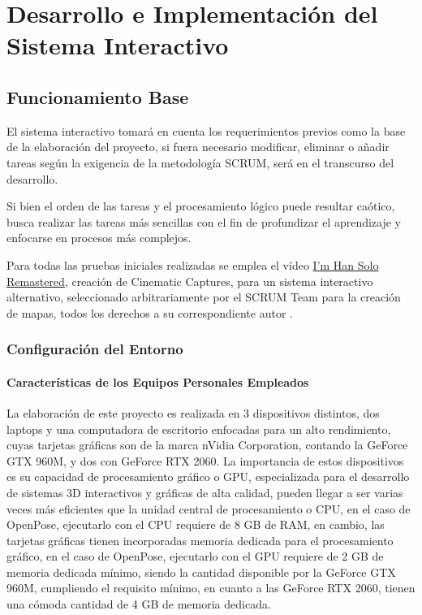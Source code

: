 \chapter{Desarrollo e Implementación del Sistema Interactivo}

\section{Funcionamiento Base}

El sistema interactivo tomará en cuenta los requerimientos previos como la base de la elaboración del proyecto, si fuera necesario modificar, eliminar o añadir tareas según la exigencia de la metodología SCRUM, será en el transcurso del desarrollo.

Si bien el orden de las tareas y el procesamiento lógico puede resultar caótico, busca realizar las tareas más sencillas con el fin de profundizar el aprendizaje y enfocarse en procesos más complejos.

Para todas las pruebas iniciales realizadas se emplea el vídeo \href{https://www.youtube.com/watch?v=ymV-R5vAuQI}{I'm Han Solo Remastered}, creación de Cinematic Captures, para un sistema interactivo alternativo, seleccionado arbitrariamente por el SCRUM Team para la creación de mapas, todos los derechos a su correspondiente autor \cite{cinematiccaptures}.

\subsection{Configuración del Entorno}

\subsubsection{Características de los Equipos Personales Empleados}

La elaboración de este proyecto es realizada en 3 dispositivos distintos, dos laptops y una computadora de escritorio enfocadas para un alto rendimiento, cuyas tarjetas gráficas son de la marca nVidia Corporation, contando la GeForce GTX 960M, y dos con GeForce RTX 2060. La importancia de estos dispositivos es su capacidad de procesamiento gráfico o GPU, especializada para el desarrollo de sistemas 3D interactivos y gráficas de alta calidad, pueden llegar a ser varias veces más eficientes que la unidad central de procesamiento o CPU, en el caso de OpenPose, ejecutarlo con el CPU requiere de 8 GB de RAM, en cambio, las tarjetas gráficas tienen incorporadas memoria dedicada para el procesamiento gráfico, en el caso de OpenPose, ejecutarlo con el GPU requiere de 2 GB de memoria dedicada mínimo, siendo la cantidad disponible por la GeForce GTX 960M, cumpliendo el requisito mínimo, en cuanto a las GeForce RTX 2060, tienen una cómoda cantidad de 4 GB de memoria dedicada.


